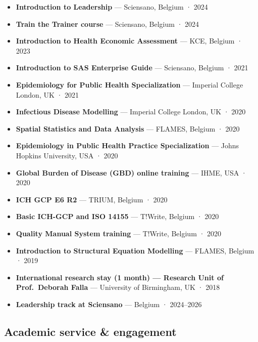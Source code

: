 \documentclass[
  letterpaper,
  DIV=11,
  numbers=noendperiod]{scrartcl}
\providecommand{\tightlist}{%
  \setlength{\itemsep}{0pt}\setlength{\parskip}{0pt}}\usepackage{longtable,booktabs,array}
\begin{document}
\begin{itemize}
\tightlist
\item
  \textbf{Introduction to Leadership} --- Sciensano, Belgium · 2024
\item
  \textbf{Train the Trainer course} --- Sciensano, Belgium · 2024
\item
  \textbf{Introduction to Health Economic Assessment} --- KCE, Belgium ·
  2023
\item
  \textbf{Introduction to SAS Enterprise Guide} --- Sciensano, Belgium ·
  2021
\item
  \textbf{Epidemiology for Public Health Specialization} --- Imperial
  College London, UK · 2021
\item
  \textbf{Infectious Disease Modelling} --- Imperial College London, UK
  · 2020
\item
  \textbf{Spatial Statistics and Data Analysis} --- FLAMES, Belgium ·
  2020
\item
  \textbf{Epidemiology in Public Health Practice Specialization} ---
  Johns Hopkins University, USA · 2020
\item
  \textbf{Global Burden of Disease (GBD) online training} --- IHME, USA
  · 2020
\item
  \textbf{ICH GCP E6 R2} --- TRIUM, Belgium · 2020
\item
  \textbf{Basic ICH-GCP and ISO 14155} --- T!Write, Belgium · 2020
\item
  \textbf{Quality Manual System training} --- T!Write, Belgium · 2020
\item
  \textbf{Introduction to Structural Equation Modelling} --- FLAMES,
  Belgium · 2019
\item
  \textbf{International research stay (1 month) --- Research Unit of
  Prof.~Deborah Falla} --- University of Birmingham, UK · 2018
\item
  \textbf{Leadership track at Sciensano} --- Belgium · 2024--2026
\end{itemize}

\subsection{Academic service \& engagement}\label{service}
\end{document}
